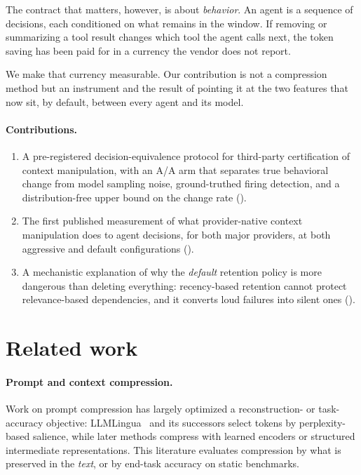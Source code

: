 \documentclass[11pt]{article}
\begin{document}
The contract that matters, however, is about \emph{behavior}. An agent is a
sequence of decisions, each conditioned on what remains in the window. If removing
or summarizing a tool result changes which tool the agent calls next, the token
saving has been paid for in a currency the vendor does not report.

We make that currency measurable. Our contribution is not a compression method but
an instrument and the result of pointing it at the two features that now sit,
by default, between every agent and its model.

\paragraph{Contributions.}
\begin{enumerate}
  \item A pre-registered decision-equivalence protocol for third-party
    certification of context manipulation, with an A/A arm that separates true
    behavioral change from model sampling noise, ground-truthed firing detection,
    and a distribution-free upper bound on the change rate
    ().
  \item The first published measurement of what provider-native context
    manipulation does to agent decisions, for both major providers, at both
    aggressive and default configurations ().
  \item A mechanistic explanation of why the \emph{default} retention policy is
    more dangerous than deleting everything: recency-based retention cannot
    protect relevance-based dependencies, and it converts loud failures into
    silent ones ().
\end{enumerate}

\section{Related work}
\label{sec:related}

\paragraph{Prompt and context compression.}
Work on prompt compression has largely optimized a reconstruction- or
task-accuracy objective: LLMLingua~\cite{llmlingua,longllmlingua,llmlinguatwo} and
its successors select tokens by
perplexity-based salience, while later methods compress with learned encoders or
structured intermediate representations. This literature evaluates compression by
what is preserved in the \emph{text}, or by end-task accuracy on static
benchmarks.
\end{document}
